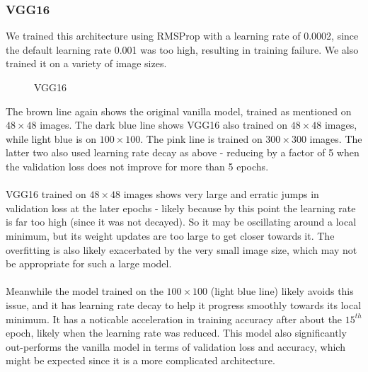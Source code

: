 \documentclass[11pt]{article} %
\theoremstyle{plain}
\theoremstyle{definition}
\begin{document}
\subsubsection{VGG16}
We trained this architecture using RMSProp with a learning rate of 0.0002, since the default learning rate 0.001 was too high, resulting in training failure.  We also trained it on a variety of image sizes.
\begin{figure}[!ht]
\centering
{}
\newline
{}
\caption{VGG16}
\label{fig:VGG16_Results}
\end{figure}
\FloatBarrier
\noindent
The brown line again shows the original vanilla model, trained as mentioned on \(48 \times 48\) images. The dark blue line shows VGG16 also trained on \(48 \times 48\) images, while light blue is on \(100 \times 100\). The pink line is trained on \(300 \times 300\) images. The latter two also used learning rate decay as above - reducing by a factor of 5 when the validation loss does not improve for more than 5 epochs.
\\
\\
\noindent
VGG16 trained on \(48 \times 48\) images shows very large and erratic jumps in validation loss at the later epochs - likely because by this point the learning rate is far too high (since it was not decayed). So it may be oscillating around a local minimum, but its weight updates are too large to get closer towards it. The overfitting is also likely exacerbated by the very small image size, which may not be appropriate for such a large model. 
\\
\\
\noindent
Meanwhile the model trained on the \(100 \times 100\) (light blue line) likely avoids this issue, and it has learning rate decay to help it progress smoothly towards its local minimum. It has a noticable acceleration in training accuracy after about the \(15^{th}\) epoch, likely when the learning rate was reduced. This model also significantly out-performs the vanilla model in terms of validation loss and accuracy, which might be expected since it is a more complicated architecture.
\end{document}
